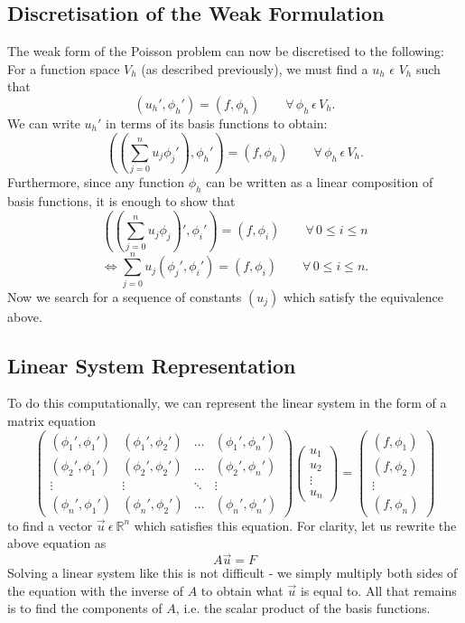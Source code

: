\documentclass{article}
\begin{document}
\subsection{Discretisation of the Weak Formulation}
The weak form of the Poisson problem can now be discretised to the following:
For a function space $V_h$ (as described previously), we must find a $u_h$ $\epsilon$ $V_h$ such that 
\[(u_h',\phi_h ') = (f , \phi_h) \qquad\forall\,\phi_h\, \epsilon\, V_h.\]
We can write $u_h'$ in terms of its basis functions to obtain:
\[((\sum_{j=0}^{n}u_j\phi_j'),\phi_h ') = (f , \phi_h) \qquad\forall\,\phi_h\, \epsilon\, V_h.\]
Furthermore, since any function $\phi_h$ can be written as a linear composition of basis functions, it is enough to show that
\[((\sum_{j=0}^{n}u_j\phi_j)',\phi_i ') = (f , \phi_i) \qquad\forall\,0 \leq i \leq n\]
\[\iff \sum_{j=0}^{n}u_j(\phi_j',\phi_i ') = (f , \phi_i) \qquad\forall\,0 \leq i \leq n. \]
Now we search for a sequence of constants $(u_j)$ which satisfy the equivalence above. 
\subsection{Linear System Representation}
To do this computationally, we can represent the linear system in the form of a matrix equation
\[\begin{pmatrix}
(\phi_1',\phi_1 ') & (\phi_1',\phi_2 ') & \hdots &(\phi_1',\phi_n ')\\
(\phi_2',\phi_1 ') & (\phi_2',\phi_2 ') & \hdots &(\phi_2',\phi_n ')\\
\vdots &  \vdots &  \ddots &  \vdots\\
(\phi_n',\phi_1 ') & (\phi_n',\phi_2 ') &\hdots &(\phi_n',\phi_n ')
\end{pmatrix}
\begin{pmatrix}
u_1\\
u_2\\
\vdots\\
u_n
\end{pmatrix} =
\begin{pmatrix}
(f , \phi_1) \\
(f , \phi_2) \\
\vdots\\
(f , \phi_n)
\end{pmatrix}\]
to find a vector $\vec{u}\ \epsilon\ \mathbb{R}^n$ which satisfies this equation. For clarity, let us rewrite the above equation as $$A \vec{u} = F$$ Solving a linear system like this is not difficult - we simply multiply both sides of the equation with the inverse of $A$ to obtain what $\vec{u}$ is equal to. All that remains is to find the components of $A$, i.e. the scalar product of the basis functions. 
\end{document}
